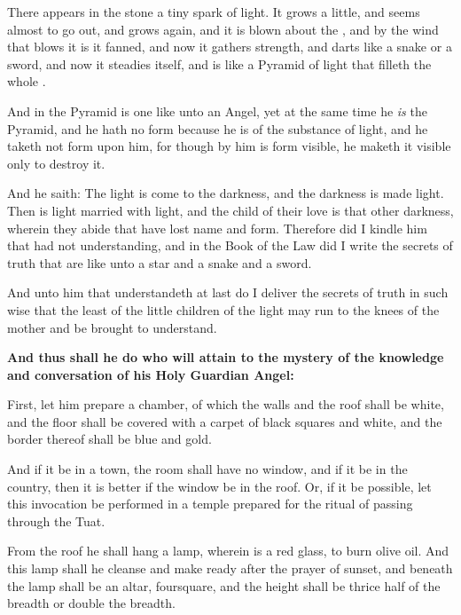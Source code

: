 

There appears in the stone a tiny spark of light. It grows a little, and seems almost to go out, and grows again, and it is blown about the \AEthyr, and by the wind that blows it is it fanned, and now it gathers strength, and darts like a snake or a sword, and now it steadies itself, and is like a Pyramid of light that filleth the whole \AEthyr.

And in the Pyramid is one like unto an Angel, yet at the same time he \textit{is} the Pyramid, and he hath no form because he is of the substance of light, and he taketh not form upon him, for though by him is form visible, he maketh it visible only to destroy it.

And he saith: The light is come to the darkness, and the darkness is made light. Then is light married with light, and the child of their love is that other darkness, wherein they abide that have lost name and form. Therefore did I kindle him that had not understanding, and in the Book of the Law did I write the secrets of truth that are like unto a star and a snake and a sword.

And unto him that understandeth at last do I deliver the secrets of truth in such wise that the least of the little children of the light may run to the knees of the mother and be brought to understand.


\textbf{And thus shall he do who will attain to the mystery of the knowledge and conversation of his Holy Guardian Angel:}


First, let him prepare a chamber, of which the walls and the roof shall be white, and the floor shall be covered with a carpet of black squares and white, and the border thereof shall be blue and gold.

And if it be in a town, the room shall have no window, and if it be in the country, then it is better if the window be in the roof. Or, if it be possible, let this invocation be performed in a temple prepared for the ritual of passing through the Tuat.

From the roof he shall hang a lamp, wherein is a red glass, to burn olive oil. And this lamp shall he cleanse and make ready after the prayer of sunset, and beneath the lamp shall be an altar, foursquare, and the height shall be thrice half of the breadth or double the breadth.

